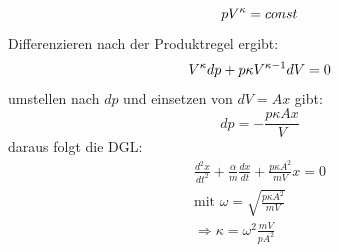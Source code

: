 \documentclass[10pt,a4paper]{article}
\begin{document}
\begin{equation}
p V^{\kappa}=const \notag
\end{equation}
Differenzieren nach der Produktregel ergibt:
\begin{equation}
V^{\kappa} dp + p \kappa V^{\kappa -1} dV =0 \notag
\end{equation}
umstellen nach $dp$ und einsetzen von $dV=A x$ gibt:
\begin{equation}
dp=-\frac{p \kappa A x}{V}
\end{equation}
daraus folgt die DGL:
\begin{align}
\frac{d^2x}{dt^2}+\frac{\alpha}{m}\frac{dx}{dt}+ \frac{p \kappa A^2}{mV} x=0\\
\text{mit } \omega= \sqrt{\frac{p \kappa A^2}{mV}}\\
\Rightarrow \kappa = \omega^2\frac{m V}{p A^2}
\end{align}
\end{document}
